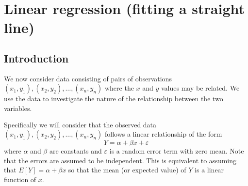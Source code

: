 \documentclass[12pt]{article}
\begin{document}
%


\newpage
\section{Linear regression (fitting a straight line)}
\subsection{Introduction}
We now consider data consisting of pairs of observations $(x_{1},y_{1}),(x_{2},y_{2}),\dots,(x_{n},y_{n})$ where the $x$ and $y$ values may be related. We use the data to investigate the nature of the relationship between the two variables.

Specifically we will consider that the observed data $(x_{1},y_{1}),(x_{2},y_{2}),\dots,(x_{n},y_{n})$  follows a linear relationship of the form $$Y=\alpha+\beta x +\varepsilon$$
where $\alpha$ and $\beta$ are constants and $\varepsilon$ is a random error term with zero mean. Note that the errors are assumed to be independent. This is equivalent to assuming that $E[Y]=\alpha+\beta x$ so that the mean (or expected value) of $Y$ is a linear function of $x$.
\end{document}
